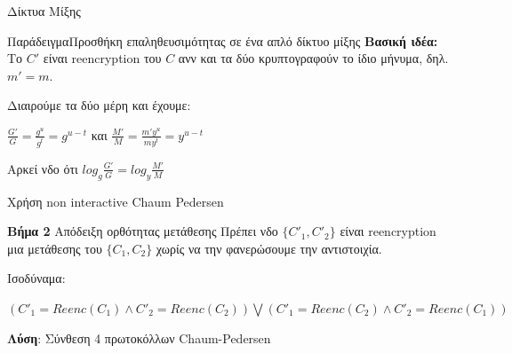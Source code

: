 \documentclass[handout]{beamer}
\begin{document}
\begin{section}{Δίκτυα Μίξης}
\begin{frame}[allowframebreaks]{Παράδειγμα}{Προσθήκη επαληθευσιμότητας σε ένα απλό δίκτυο μίξης}
\textbf{Βασική ιδέα:} Το ${C'}$ είναι reencryption του $C$ ανν και τα δύο κρυπτογραφούν το ίδιο μήνυμα, δηλ. $m'=m$.

Διαιρούμε τα δύο μέρη και έχουμε:
\begin{center}
$\frac{G'}{G}=\frac{g^u}{g^t}=g^{u-t}$ και 
$\frac{M'}{M}=\frac{m' y^u}{m y^t}=y^{u-t}$ 
\end{center}

Αρκεί νδο ότι $ log_g \frac{G'}{G} = log_y \frac{M'}{M}$

Χρήση non interactive Chaum Pedersen

\framebreak

\begin{block}{\textbf{Βήμα 2} Απόδειξη ορθότητας μετάθεσης }
Πρέπει νδο $\{C'_1,C'_2\}$ είναι reencryption μια μετάθεσης του $\{C_1,C_2\}$ χωρίς να την φανερώσουμε την αντιστοιχία. \\
\end{block}
 

Ισοδύναμα:
\begin{center}
$(C'_1 = Reenc(C_1) \wedge C'_2 = Reenc(C_2)) \bigvee (C'_1 = Reenc(C_2) \wedge C'_2 = Reenc(C_1))$
\end{center}

 
\textbf{Λύση}: Σύνθεση 4 πρωτοκόλλων Chaum-Pedersen
 
\end{frame}
\end{section} 
\end{document}
